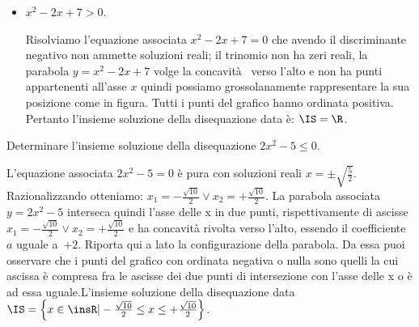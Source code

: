 \begin{esempio}
\begin{itemize}
\item \(x^2-2x+7>0\).

\begin{minipage}{.76\linewidth}
Risolviamo l'equazione associata \(x^2-2x+7=0\) che avendo il discriminante 
negativo non ammette soluzioni reali; il trinomio non ha zeri reali, la 
parabola 
\(y=x^2-2x+7\) volge la concavità  verso l'alto e non ha punti appartenenti 
all'asse \(x\) quindi possiamo grossolanamente rappresentare la sua posizione  
come in figura. Tutti i punti del grafico hanno ordinata positiva. Pertanto 
l'insieme soluzione della disequazione data è: \(\IS=\R\).
\end{minipage}
\hfill
\begin{minipage}{.22\linewidth}
 \parabolac
\end{minipage}

\end{itemize}

%  
% 

\end{esempio}

% 
% 
% 

\begin{esempio}
Determinare l'insieme soluzione della disequazione \(2x^2-5\le 0\).

L'equazione associata \(2x^2-5=0\) è pura con soluzioni reali \(x=\pm 
\sqrt{\frac 
5 2}\). Razionalizzando otteniamo: \(x_1=-\frac{\sqrt{10}} 2\vee 
x_2=+\frac{\sqrt{10}} 2\). La parabola associata \(y=2x^2-5\) interseca quindi 
l'asse delle x in due punti, rispettivamente di ascisse 
\(x_1=-\frac{\sqrt{10}} 2\vee x_2=+\frac{\sqrt{10}} 2\) 
e ha concavità rivolta verso l'alto, essendo il coefficiente~\(a\) uguale 
a~\(+2\).
Riporta qui a lato la configurazione della parabola.
Da essa puoi osservare che i punti del grafico con ordinata negativa o nulla 
sono quelli la cui ascissa è compresa fra le ascisse dei due punti di 
intersezione con l'asse delle x o è ad essa uguale.L'insieme soluzione della 
disequazione data 
 \(\IS=\left\{x\in \insR | -\frac{\sqrt{10}} 2\le x\le +\frac{\sqrt{10}} 
2\right\}\).
\end{esempio}


